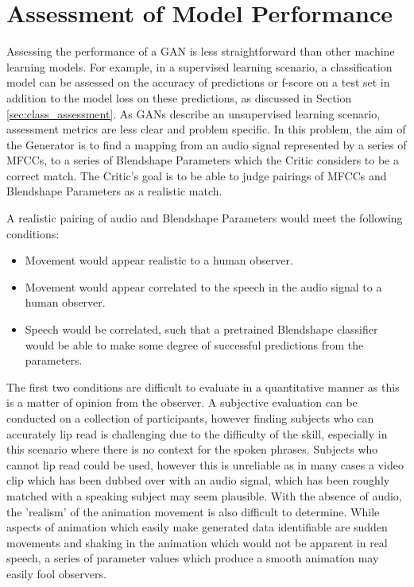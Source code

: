 \section{Assessment of Model Performance} \label{sec:gan_assessment}
Assessing the performance of a GAN is less straightforward than other machine learning models.
For example, in a supervised learning scenario, a classification model can be assessed on the accuracy of predictions or f-score on a test set in addition to the model loss on these predictions, as discussed in Section \ref{sec:class_assessment}.
As GANs describe an unsupervised learning scenario, assessment metrics are less clear and problem specific.
In this problem, the aim of the Generator is to find a mapping from an audio signal represented by a series of MFCCs, to a series of Blendshape Parameters which the Critic considers to be a correct match.
The Critic's goal is to be able to judge pairings of MFCCs and Blendshape Parameters as a realistic match.

A realistic pairing of audio and Blendshape Parameters would meet the following conditions:
\begin{itemize}
    \item Movement would appear realistic to a human observer.
    \item Movement would appear correlated to the speech in the audio signal to a human observer.
    \item Speech would be correlated, such that a pretrained Blendshape classifier would be able to make some degree of successful predictions from the parameters.
\end{itemize}

The first two conditions are difficult to evaluate in a quantitative manner as this is a matter of opinion from the observer.
A subjective evaluation can be conducted on a collection of participants, however finding subjects who can accurately lip read is challenging due to the difficulty of the skill, especially in this scenario where there is no context for the spoken phrases.
Subjects who cannot lip read could be used, however this is unreliable as in many cases a video clip which has been dubbed over with an audio signal, which has been roughly matched with a speaking subject may seem plausible.
With the absence of audio, the 'realism' of the animation movement is also difficult to determine.
While aspects of animation which easily make generated data identifiable are sudden movements and shaking in the animation which would not be apparent in real speech, a series of parameter values which produce a smooth animation may easily fool observers.

